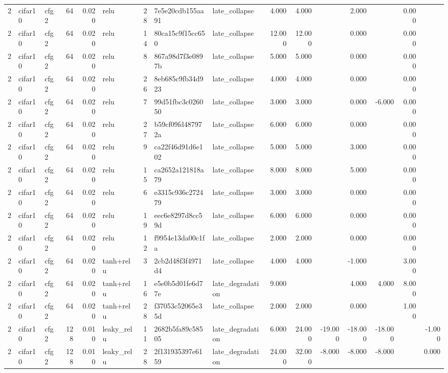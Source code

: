 \begin{table}[htbp]
{\begin{tabular}{@{}rllrrlrllrrrrrrr@{}}
2 & cifar10 & cfg2 & 64 & 0.020 & relu & 28 & 7e5e20cdb155aa91 & late\_collapse & 4.000 & 4.000 &  & 2.000 &  & 0.000 &  \\
2 & cifar10 & cfg2 & 64 & 0.020 & relu & 14 & 80ca15c9f15cc650 & late\_collapse & 12.000 & 12.000 &  & 0.000 &  & 0.000 &  \\
2 & cifar10 & cfg2 & 64 & 0.020 & relu & 8 & 867a98d7f3e0897b & late\_collapse & 5.000 & 5.000 &  & 0.000 &  & 0.000 &  \\
2 & cifar10 & cfg2 & 64 & 0.020 & relu & 26 & 8eb685c9fb34d923 & late\_collapse & 4.000 & 4.000 &  & 0.000 &  & 0.000 &  \\
2 & cifar10 & cfg2 & 64 & 0.020 & relu & 7 & 99d51fbc3c026050 & late\_collapse & 3.000 & 3.000 &  & 0.000 & -6.000 & 0.000 &  \\
2 & cifar10 & cfg2 & 64 & 0.020 & relu & 27 & b59cf09fd487972a & late\_collapse & 6.000 & 6.000 &  & 0.000 &  & 0.000 &  \\
2 & cifar10 & cfg2 & 64 & 0.020 & relu & 9 & ca22f46d91d6e102 & late\_collapse & 5.000 & 5.000 &  & 3.000 &  & 0.000 &  \\
2 & cifar10 & cfg2 & 64 & 0.020 & relu & 15 & ca2652a121818a79 & late\_collapse & 8.000 & 8.000 &  & 5.000 &  & 0.000 &  \\
2 & cifar10 & cfg2 & 64 & 0.020 & relu & 6 & e3315c936c272479 & late\_collapse & 3.000 & 3.000 &  & 0.000 &  & 0.000 &  \\
2 & cifar10 & cfg2 & 64 & 0.020 & relu & 19 & eec6e8297d8cc59d & late\_collapse & 6.000 & 6.000 &  & 0.000 &  & 0.000 &  \\
2 & cifar10 & cfg2 & 64 & 0.020 & relu & 12 & f9954e13da00c1fa & late\_collapse & 2.000 & 2.000 &  & 0.000 &  & 0.000 &  \\
2 & cifar10 & cfg2 & 64 & 0.020 & tanh+relu & 3 & 2cb2d48f3f4971d4 & late\_collapse & 4.000 & 4.000 &  & -1.000 &  & 3.000 &  \\
2 & cifar10 & cfg2 & 64 & 0.020 & tanh+relu & 16 & e5e0b5d01fe6d77e & late\_degradation & 9.000 &  &  & 4.000 & 4.000 & 8.000 &  \\
2 & cifar10 & cfg2 & 64 & 0.020 & tanh+relu & 28 & f37053c52065e35d & late\_collapse & 2.000 & 2.000 &  & 0.000 &  & 1.000 &  \\
2 & cifar10 & cfg2 & 128 & 0.010 & leaky\_relu & 11 & 2682b5fa89c58505 & late\_degradation & 6.000 & 24.000 & -19.000 & -18.000 & -18.000 &  & -1.000 \\
2 & cifar10 & cfg2 & 128 & 0.010 & leaky\_relu & 28 & 2f131935397e6159 & late\_degradation & 24.000 & 32.000 & -8.000 & -8.000 & -8.000 &  & 0.000 \\

\end{tabular}}
\end{table}
